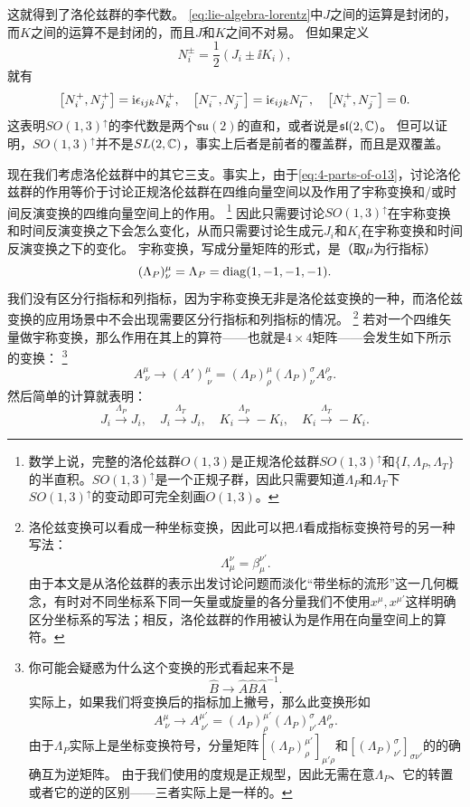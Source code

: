 这就得到了洛伦兹群的李代数。
\eqref{eq:lie-algebra-lorentz}中$J$之间的运算是封闭的，而$K$之间的运算不是封闭的，而且$J$和$K$之间不对易。
但如果定义
\begin{equation}
    N_i^\pm = \frac{1}{2} (J_i \pm \ii K_i),
    \label{eq:def-n-pm}
\end{equation}
就有
\begin{equation}
    \comm{N_i^+}{N_j^+} = \ii \epsilon_{ijk} N_k^+, \quad \comm{N_i^-}{N_j^-} = \ii \epsilon_{ijk} N_l^-, \quad \comm{N^+_i}{N^-_j} = 0.
    \label{eq:two-su2-algebra}
\end{equation}
这表明$SO(1,3)^\uparrow$的李代数是两个$\mathfrak{su}(2)$的直和，或者说是$\mathfrak{sl}(2, \mathbb{C})$。
但可以证明，$SO(1,3)^\uparrow$并不是$SL(2, \mathbb{C})$，事实上后者是前者的覆盖群，而且是双覆盖。

现在我们考虑洛伦兹群中的其它三支。事实上，由于\eqref{eq:4-parts-of-o13}，讨论洛伦兹群的作用等价于讨论正规洛伦兹群在四维向量空间以及作用了宇称变换和/或时间反演变换的四维向量空间上的作用。%
\footnote{数学上说，完整的洛伦兹群$O(1,3)$是正规洛伦兹群$SO(1,3)^\uparrow$和$\{I, \Lambda_P, \Lambda_T\}$的半直积。$SO(1,3)^\uparrow$是一个正规子群，因此只需要知道$\Lambda_P$和$\Lambda_T$下$SO(1,3)^\uparrow$的变动即可完全刻画$O(1,3)$。}%
因此只需要讨论$SO(1,3)^\uparrow$在宇称变换和时间反演变换之下会怎么变化，从而只需要讨论生成元$J_i$和$K_i$在宇称变换和时间反演变换之下的变化。
宇称变换，写成分量矩阵的形式，是（取$\mu$为行指标）
\[
    (\Lambda_P)^\mu_\nu = \Lambda_P = \operatorname{diag}(1, -1, -1, -1).
\]
我们没有区分行指标和列指标，因为宇称变换无非是洛伦兹变换的一种，而洛伦兹变换的应用场景中不会出现需要区分行指标和列指标的情况。%
\footnote{洛伦兹变换可以看成一种坐标变换，因此可以把$\Lambda$看成指标变换符号的另一种写法：
\[
    \Lambda_\mu^\nu = \beta_{\mu}^{\nu'}.
\]
由于本文是从洛伦兹群的表示出发讨论问题而淡化“带坐标的流形”这一几何概念，有时对不同坐标系下同一矢量或旋量的各分量我们不使用$x^\mu, x^{\mu'}$这样明确区分坐标系的写法；相反，洛伦兹群的作用被认为是作用在向量空间上的算符。
}%
若对一个四维矢量做宇称变换，那么作用在其上的算符——也就是$4\times 4$矩阵——会发生如下所示的变换：%
\footnote{你可能会疑惑为什么这个变换的形式看起来不是
\[
    \hat{B} \longrightarrow \hat{A} \hat{B} \hat{A}^{-1}.
\]
实际上，如果我们将变换后的指标加上撇号，那么此变换形如
\[
    A^\mu_{\ \nu} \longrightarrow A^{\mu'}_{\ \nu'} = (\Lambda_P)^{\mu'}_\rho (\Lambda_P)^\sigma_{\nu'} A^\rho_{\ \sigma}.
\]
由于$\Lambda_P$实际上是坐标变换符号，分量矩阵$[(\Lambda_P)^{\mu'}_\rho]_{\mu' \rho}$和$[(\Lambda_P)^\sigma_{\nu'}]_{\sigma \nu'}$的的确确互为逆矩阵。
由于我们使用的度规是正规型，因此无需在意$\Lambda_P$、它的转置或者它的逆的区别——三者实际上是一样的。
}%
\[
    A^\mu_{\ \nu} \longrightarrow (A')^\mu_{\ \nu} = (\Lambda_P)^\mu_\rho (\Lambda_P)^\sigma_\nu A^\rho_{\ \sigma}.
\]
然后简单的计算就表明：
\begin{equation}
    J_i \stackrel{\Lambda_P}{\longrightarrow} J_i, \quad J_i \stackrel{\Lambda_T}{\longrightarrow} J_i, \quad K_i \stackrel{\Lambda_P}{\longrightarrow} - K_i, \quad K_i \stackrel{\Lambda_T}{\longrightarrow} - K_i.
    \label{eq:parity-and-time-reversion-transform}
\end{equation}

